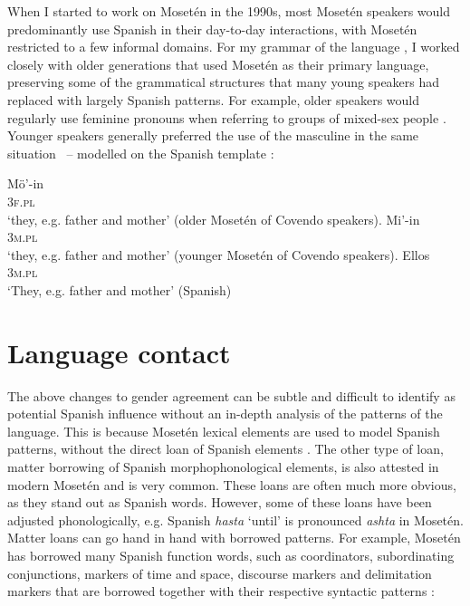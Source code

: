 \documentclass[output=paper,colorlinks,citecolor=brown
]{langscibook}
\begin{document}
When I started to work on Mosetén in the 1990s, most Mosetén speakers would predominantly use Spanish in their day-to-day interactions, with Mosetén restricted to a few informal domains. For my grammar of the language \citep{sakel2004grammar}, I worked closely with older generations that used Mosetén as their primary language, preserving some of the grammatical structures that many young speakers had replaced with largely Spanish patterns. For example, older speakers would regularly use feminine pronouns when referring to groups of mixed-sex people . Younger speakers generally preferred the use of the masculine in the same situation ~– modelled on the Spanish template :\largerpage

\ea \label{sakel_example_1}
\gll Mö'-in\\
     3\textsc{f}.\textsc{pl}\\
\glt `they, e.g. father and mother' (older Mosetén of Covendo speakers).
\ex \label{sakel_example_2}
\gll Mi'-in\\
     3\textsc{m}.\textsc{pl}\\
\glt `they, e.g. father and mother' (younger Mosetén of Covendo speakers).
\ex \label{sakel_example_3}
\gll Ellos\\
     3\textsc{m}.\textsc{pl}\\
\glt `They, e.g. father and mother' (Spanish)
\z
{} %

\section{Language contact}
The above changes to gender agreement can be subtle and difficult to identify as potential Spanish influence without an in-depth analysis of the patterns of the language. This is because Mosetén lexical elements are used to model Spanish patterns, without the direct loan of Spanish elements \citep{matras2007grammatical, matras2007investigating}. The other type of loan, matter borrowing of Spanish morphophonological elements, is also attested in modern Mosetén and is very common. These loans are often much more obvious, as they stand out as Spanish words. However, some of these loans have been adjusted phonologically, e.g. Spanish \textit{hasta} ‘until’ is pronounced \textit{ashta} in Mosetén. Matter loans can go hand in hand with borrowed patterns. For example, Mosetén has borrowed many Spanish function words, such as coordinators, subordinating conjunctions, markers of time and space, discourse markers and delimitation markers that are borrowed together with their respective syntactic patterns \citep{sakel2007language, sakel2007moseten}:
\end{document}
